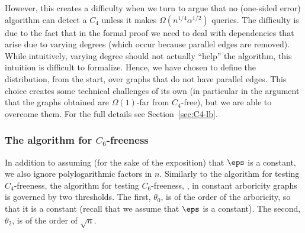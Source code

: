 However, this creates a 
difficulty when we turn to argue that no (one-sided error) algorithm can detect a $C_4$ unless it makes $\Omega(n^{1/4}\alpha^{1/2})$ queries. The difficulty is due to the fact that %
in the formal proof we need to deal with dependencies that arise due to varying degrees (which occur because parallel edges are removed). While intuitively, varying degree should not actually ``help'' the algorithm, this intuition is difficult to formalize.
Hence, we have chosen to define the distribution, from the start, over graphs that do not have parallel edges.
This choice creates some technical challenges of its own (in particular in the argument that the graphs obtained are $\Omega(1)$-far from $C_4$-free), but we are able to overcome them. For the full details see Section~\ref{sec:C4-lb}.




\subsubsection{The algorithm for $C_6$-freeness}
In addition to assuming (for the sake of the exposition) that $\eps$ is a constant, we also 
ignore polylogarithmic factors in $n$. Similarly to the algorithm for testing $C_4$-freeness, the algorithm for testing $C_6$-freeness, \TestCsix,  in constant arboricity graphs is governed by two thresholds. The first, $\theta_0$, is of the order of the arboricity, so that it is a constant (recall that we assume that $\eps$ is a constant). The second, $\theta_2$, is of the order of $\sqrt{n}$.

